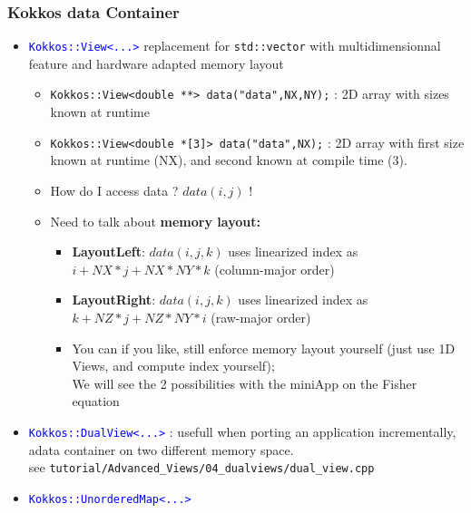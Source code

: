 \begin{frame}[fragile=singleslide]
  \frametitle{Kokkos data Container}

  \begin{itemize}
  \item \textcolor{blue}{\texttt{Kokkos::View<...>}} replacement for \texttt{std::vector} with multidimensionnal feature and hardware adapted memory layout\\
    \begin{itemize}
    \item \texttt{Kokkos::View<double **> data("data",NX,NY);} : 2D array with sizes known at runtime
    \item \texttt{Kokkos::View<double *[3]> data("data",NX);} : 2D array with first size known at runtime (NX), and second known at compile time (3).
    \item How do I access data ? $data(i,j)$ !
    \item Need to talk about \textbf{memory layout:}\\
      \begin{itemize}
      \item \textbf{LayoutLeft}: $data(i,j,k)$ uses linearized index as $i + NX*j + NX*NY * k$ (column-major order)
      \item \textbf{LayoutRight}: $data(i,j,k)$ uses linearized index as $k + NZ*j + NZ*NY * i$ (raw-major order)
      \item You can if you like, still enforce memory layout yourself (just use 1D Views, and compute index yourself);\\
        We will see the 2 possibilities with the miniApp on the Fisher equation
      \end{itemize}
    \end{itemize}

  \item \textcolor{blue}{\texttt{Kokkos::DualView<...>}} : usefull when porting an application incrementally, adata container on two different memory space.\\
    see \texttt{tutorial/Advanced\_Views/04\_dualviews/dual\_view.cpp}
  \item \textcolor{blue}{\texttt{Kokkos::UnorderedMap<...>}}
  \end{itemize}

\end{frame}


